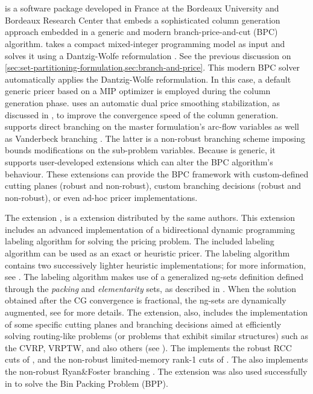 \section{\bapcod{}}
\label{sec:results-bapcod}

\bapcod{} \parencite{sadykov2021} is a software package
developed in France at the Bordeaux University and Bordeaux Research Center
that embeds a sophisticated column generation approach
embedded in a generic and modern branch-price-and-cut (BPC) algorithm.
\bapcod{} takes a compact mixed-integer programming model as input
and solves it using a Dantzig-Wolfe reformulation \parencite{dantzig1960}.
See the previous discussion on \cref{sec:set-partitioning-formulation,sec:branch-and-price}.
This modern BPC solver automatically applies the Dantzig-Wolfe reformulation.
In this case, a default generic pricer based on a MIP optimizer
is employed during the column generation phase.
\bapcod{} uses an automatic dual price smoothing stabilization,
as discussed in \textcite{pessoa2018automation},
to improve the convergence speed of the column generation.
\bapcod{} supports direct branching on the master formulation's arc-flow variables
as well as Vanderbeck branching \parencite{vanderbeck2011}.
The latter is a non-robust branching scheme imposing bounds modifications on the sub-problem variables.
Because \bapcod{} is generic, it supports user-developed extensions
which can alter the BPC algorithm's behaviour.
These extensions can provide the BPC framework with
custom-defined cutting planes (robust and non-robust),
custom branching decisions (robust and non-robust),
or even ad-hoc pricer implementations.

The \vrpsolver{} extension \parencite{pessoa2020generic}, is
a \bapcod{} extension distributed by the same authors.
This extension includes an
advanced implementation of a bidirectional dynamic programming labeling algorithm
\parencite{sadykov2021bucket} for solving the pricing problem.
The included labeling algorithm
can be used as an exact or heuristic pricer.
The labeling algorithm contains two successively lighter heuristic implementations;
for more information, see \textcite{sadykov2021bucket}.
The labeling algorithm makes use of a generalized ng-sets definition \parencite{baldacci2011}
defined through the \textit{packing} and \textit{elementarity} sets,
as described in \textcite{pessoa2020generic}.
When the solution obtained after the CG convergence is fractional,
the ng-sets are dynamically augmented,
see \textcite{pessoa2020generic} for more details.
The \vrpsolver{} extension, also,
includes the implementation of some
specific cutting planes and branching decisions
aimed at efficiently solving routing-like problems
(or problems that exhibit similar structures)
such as the CVRP, VRPTW, and also others (see \cite{pessoa2020generic}).
The \vrpsolver{} implements the robust RCC cuts of \textcite{laporte1983},
and the non-robust limited-memory rank-1 cuts of \textcite{pecin2017improved}.
The \vrpsolver{} also implements the non-robust Ryan\&Foster branching \parencite{ryan1981integer}.
The \vrpsolver{} extension was also used successfully in \textcite{pessoa2020}
to solve the Bin Packing Problem (BPP).

